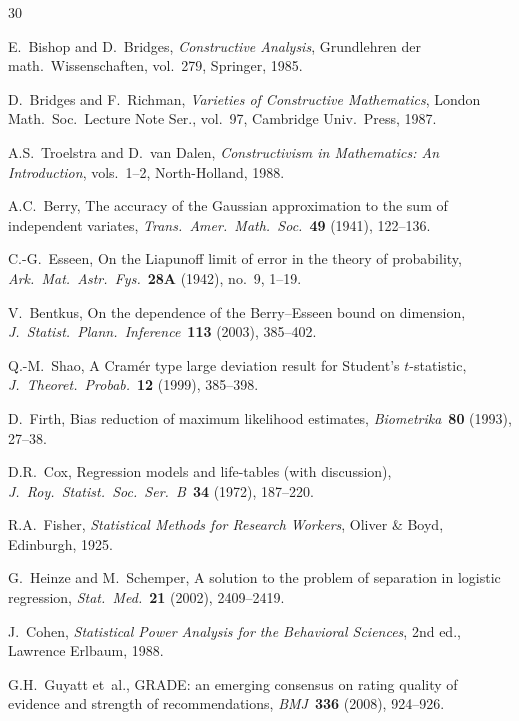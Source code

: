 \documentclass[11pt,a4paper]{article}
\theoremstyle{plain}
\theoremstyle{definition}
\begin{document}
\begin{thebibliography}{30}

E.~Bishop and D.~Bridges, \emph{Constructive Analysis}, Grundlehren der math.\ Wissenschaften, vol.~279, Springer, 1985.

D.~Bridges and F.~Richman, \emph{Varieties of Constructive Mathematics}, London Math.\ Soc.\ Lecture Note Ser., vol.~97, Cambridge Univ.\ Press, 1987.

A.S.~Troelstra and D.~van Dalen, \emph{Constructivism in Mathematics: An Introduction}, vols.~1--2, North-Holland, 1988.

A.C.~Berry, The accuracy of the Gaussian approximation to the sum of independent variates, \emph{Trans.\ Amer.\ Math.\ Soc.}\ \textbf{49} (1941), 122--136.

C.-G.~Esseen, On the Liapunoff limit of error in the theory of probability, \emph{Ark.\ Mat.\ Astr.\ Fys.}\ \textbf{28A} (1942), no.~9, 1--19.

V.~Bentkus, On the dependence of the Berry--Esseen bound on dimension, \emph{J.\ Statist.\ Plann.\ Inference}\ \textbf{113} (2003), 385--402.

Q.-M.~Shao, A Cram\'er type large deviation result for Student's $t$-statistic, \emph{J.\ Theoret.\ Probab.}\ \textbf{12} (1999), 385--398.

D.~Firth, Bias reduction of maximum likelihood estimates, \emph{Biometrika}\ \textbf{80} (1993), 27--38.

D.R.~Cox, Regression models and life-tables (with discussion), \emph{J.\ Roy.\ Statist.\ Soc.\ Ser.~B}\ \textbf{34} (1972), 187--220.

R.A.~Fisher, \emph{Statistical Methods for Research Workers}, Oliver \& Boyd, Edinburgh, 1925.

G.~Heinze and M.~Schemper, A solution to the problem of separation in logistic regression, \emph{Stat.\ Med.}\ \textbf{21} (2002), 2409--2419.

J.~Cohen, \emph{Statistical Power Analysis for the Behavioral Sciences}, 2nd ed., Lawrence Erlbaum, 1988.

G.H.~Guyatt et~al., GRADE: an emerging consensus on rating quality of evidence and strength of recommendations, \emph{BMJ}\ \textbf{336} (2008), 924--926.


\end{thebibliography}
\end{document}
